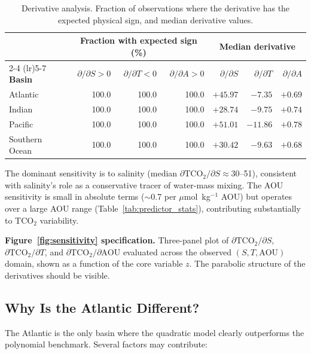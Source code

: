\documentclass[12pt,a4paper]{article}
\begin{document}
\begin{table}[htbp]
\centering
\caption{Derivative analysis. Fraction of observations where the derivative has the expected physical sign, and median derivative values.}
\label{tab:derivatives}
\begin{tabular}{l rrr rrr}
\toprule
 & \multicolumn{3}{c}{\textbf{Fraction with expected sign (\%)}} & \multicolumn{3}{c}{\textbf{Median derivative}} \\
\cmidrule(lr){2-4} \cmidrule(lr){5-7}
\textbf{Basin} & $\partial/\partial S > 0$ & $\partial/\partial T < 0$ & $\partial/\partial A > 0$ & $\partial/\partial S$ & $\partial/\partial T$ & $\partial/\partial A$ \\
\midrule
Atlantic        & 100.0 & 100.0 & 100.0 & $+45.97$ & $-7.35$ & $+0.69$ \\
Indian          & 100.0 & 100.0 & 100.0 & $+28.74$ & $-9.75$ & $+0.74$ \\
Pacific         & 100.0 & 100.0 & 100.0 & $+51.01$ & $-11.86$ & $+0.78$ \\
Southern Ocean  & 100.0 & 100.0 & 100.0 & $+30.42$ & $-9.63$ & $+0.68$ \\
\bottomrule
\end{tabular}
\end{table}

The dominant sensitivity is to salinity (median $\partial\text{TCO}_2/\partial S \approx 30$--51), consistent with salinity's role as a conservative tracer of water-mass mixing. The AOU sensitivity is small in absolute terms ($\sim$0.7 per $\mu$mol~kg$^{-1}$ AOU) but operates over a large AOU range (Table~\ref{tab:predictor_stats}), contributing substantially to TCO$_2$ variability.

\textbf{Figure~\ref{fig:sensitivity} specification.} Three-panel plot of $\partial\text{TCO}_2/\partial S$, $\partial\text{TCO}_2/\partial T$, and $\partial\text{TCO}_2/\partial\text{AOU}$ evaluated across the observed $(S, T, \text{AOU})$ domain, shown as a function of the core variable $z$. The parabolic structure of the derivatives should be visible.

\subsection{Why Is the Atlantic Different?}
\label{sec:atlantic}

The Atlantic is the only basin where the quadratic model clearly outperforms the polynomial benchmark. Several factors may contribute:
\end{document}
